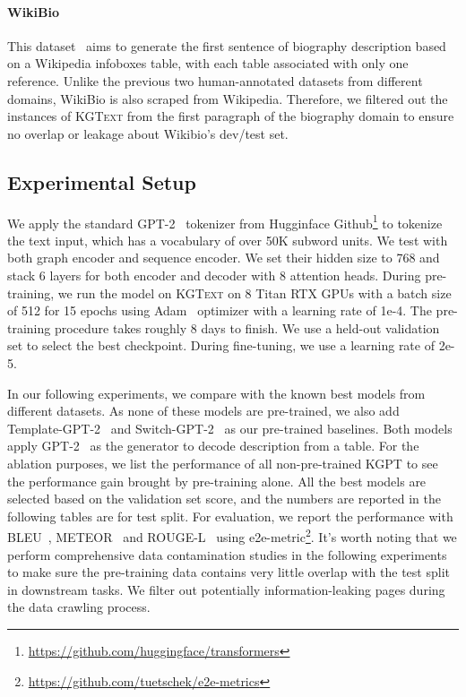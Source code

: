 \documentclass[11pt,a4paper]{article}
\newcommand{\dataset}{\textsc{KGText}\xspace}
\newcommand{\model}{KGPT\xspace}
\begin{document}
\paragraph{WikiBio}
This dataset~\cite{lebret2016neural} aims to generate the first sentence of biography description based on a Wikipedia infoboxes table, with each table associated with only one reference. Unlike the previous two human-annotated datasets from different domains, WikiBio is also scraped from Wikipedia. Therefore, we filtered out the instances of \dataset from the first paragraph of the biography domain to ensure no overlap or leakage about Wikibio's dev/test set. 

\subsection{Experimental Setup}
We apply the standard GPT-2~\cite{radford2019language} tokenizer from Hugginface Github\footnote{\url{https://github.com/huggingface/transformers}} to tokenize the text input, which has a vocabulary of over 50K subword units. We test with both graph encoder and sequence encoder. We set their hidden size to 768 and stack 6 layers for both encoder and decoder with 8 attention heads. During pre-training, we run the model on \dataset on 8 Titan RTX GPUs with a batch size of 512 for 15 epochs using Adam~\cite{kingma2014adam} optimizer with a learning rate of 1e-4. The pre-training procedure takes roughly 8 days to finish. We use a held-out validation set to select the best checkpoint. During fine-tuning, we use a learning rate of 2e-5.

In our following experiments, we compare with the known best models from different datasets. As none of these models are pre-trained, we also add Template-GPT-2~\cite{chen2020logical} and Switch-GPT-2~\cite{chen2019few} as our pre-trained baselines. Both models apply GPT-2~\cite{radford2019language} as the generator to decode description from a table. For the ablation purposes, we list the performance of all non-pre-trained \model to see the performance gain brought by pre-training alone. All the best models are selected based on the validation set score, and the numbers are reported in the following tables are for test split. For evaluation, we report the performance with BLEU~\cite{papineni2002bleu}, METEOR~\cite{banerjee2005meteor} and ROUGE-L~\cite{lin-2004-rouge} using e2e-metric\footnote{\url{https://github.com/tuetschek/e2e-metrics}}. It's worth noting that we perform comprehensive data contamination studies in the following experiments to make sure the pre-training data contains very little overlap with the test split in downstream tasks. We filter out potentially information-leaking pages during the data crawling process. 
\end{document}

